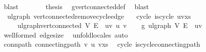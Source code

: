 \begin{isabellebody}
\ blast\isanewline
\ \ \ \ \isamarkupfalse%
\ \isamarkupfalse%
\ {\isacharquery}{\kern0pt}thesis\ \isamarkupfalse%
\ g{\isacharprime}{\kern0pt}{\isachardot}{\kern0pt}vert{\isacharunderscore}{\kern0pt}connected{\isacharunderscore}{\kern0pt}def\ \isamarkupfalse%
\ blast\isanewline
\ \ \isamarkupfalse%
\isanewline
{}\isamarkupfalse%
%
\endisatagproof
{\isafoldproof}%
%
\isadelimproof
\isanewline
%
\endisadelimproof
\isanewline
{}\isamarkupfalse%
\ {\isacharparenleft}{\kern0pt}\ ulgraph{\isacharparenright}{\kern0pt}\ vert{\isacharunderscore}{\kern0pt}connected{\isacharunderscore}{\kern0pt}remove{\isacharunderscore}{\kern0pt}cycle{\isacharunderscore}{\kern0pt}edge{\isacharcolon}{\kern0pt}\isanewline
\ \ \ cycle{\isacharcolon}{\kern0pt}\ {\isachardoublequoteopen}is{\isacharunderscore}{\kern0pt}cycle{}\ {\isacharparenleft}{\kern0pt}u{\isacharhash}{\kern0pt}v{\isacharhash}{\kern0pt}xs{\isacharparenright}{\kern0pt}{\isachardoublequoteclose}\isanewline
\ \ \ \ \ {\isachardoublequoteopen}ulgraph{\isachardot}{\kern0pt}vert{\isacharunderscore}{\kern0pt}connected\ V\ {\isacharparenleft}{\kern0pt}E\ {\isacharminus}{\kern0pt}\ {\isacharbraceleft}{\kern0pt}{\isacharbraceleft}{\kern0pt}u{\isacharcomma}{\kern0pt}v{\isacharbraceright}{\kern0pt}{\isacharbraceright}{\kern0pt}{\isacharparenright}{\kern0pt}\ u\ v{\isachardoublequoteclose}\isanewline
%
\isadelimproof
%
\endisadelimproof
%
\isatagproof
{}\isamarkupfalse%
{\isacharminus}{\kern0pt}\isanewline
\ \ \isamarkupfalse%
\ g{\isacharprime}{\kern0pt}{\isacharcolon}{\kern0pt}\ ulgraph\ V\ {\isachardoublequoteopen}E\ {\isacharminus}{\kern0pt}\ {\isacharbraceleft}{\kern0pt}{\isacharbraceleft}{\kern0pt}u{\isacharcomma}{\kern0pt}v{\isacharbraceright}{\kern0pt}{\isacharbraceright}{\kern0pt}{\isachardoublequoteclose}\ \isamarkupfalse%
\ wellformed\ edge{\isacharunderscore}{\kern0pt}size\ \isamarkupfalse%
\ {\isacharparenleft}{\kern0pt}unfold{\isacharunderscore}{\kern0pt}locales{\isacharcomma}{\kern0pt}\ auto{\isacharparenright}{\kern0pt}\isanewline
\ \ \isamarkupfalse%
\ conn{\isacharunderscore}{\kern0pt}path{\isacharcolon}{\kern0pt}\ {\isachardoublequoteopen}connecting{\isacharunderscore}{\kern0pt}path\ v\ u\ {\isacharparenleft}{\kern0pt}v{\isacharhash}{\kern0pt}xs{\isacharparenright}{\kern0pt}{\isachardoublequoteclose}\ \isamarkupfalse%
\ cycle\ is{\isacharunderscore}{\kern0pt}cycle{\isacharunderscore}{\kern0pt}connecting{\isacharunderscore}{\kern0pt}path\ \isamarkupfalse%

\end{isabellebody}
